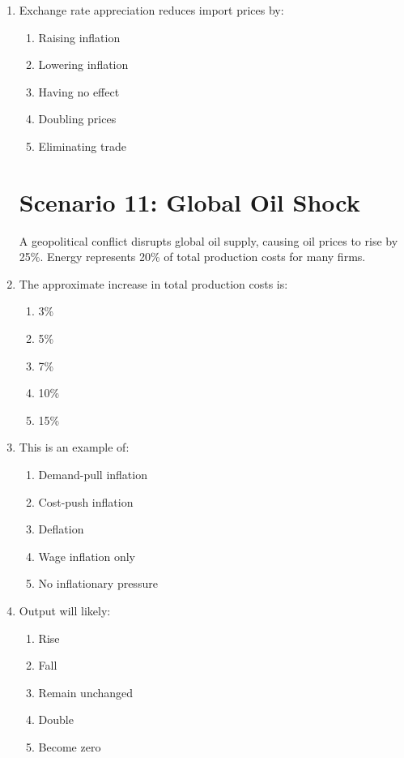 \documentclass[12pt]{article}
\begin{document}
\begin{enumerate}[label=\textbf{\arabic*.}]
\item Exchange rate appreciation reduces import prices by:
\begin{enumerate}[label=\Alph*.]
\item Raising inflation
\item Lowering inflation
\item Having no effect
\item Doubling prices
\item Eliminating trade
\end{enumerate}

\section*{Scenario 11: Global Oil Shock}

A geopolitical conflict disrupts global oil supply, causing oil prices to rise by 25\%. Energy represents 20\% of total production costs for many firms.

\item The approximate increase in total production costs is:
\begin{enumerate}[label=\Alph*.]
\item 3\%
\item 5\%
\item 7\%
\item 10\%
\item 15\%
\end{enumerate}

\item This is an example of:
\begin{enumerate}[label=\Alph*.]
\item Demand-pull inflation
\item Cost-push inflation
\item Deflation
\item Wage inflation only
\item No inflationary pressure
\end{enumerate}

\item Output will likely:
\begin{enumerate}[label=\Alph*.]
\item Rise
\item Fall
\item Remain unchanged
\item Double
\item Become zero
\end{enumerate}


\end{enumerate}
\end{document}

